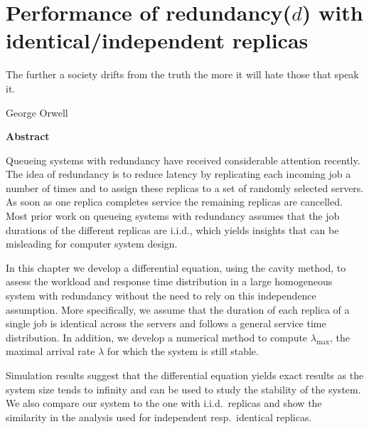 \documentclass[12pt]{report}
\newenvironment{chapabstract}{%
    \begin{center}%
      \bfseries Abstract
    \end{center}}%
   {\par}
\begin{document}
\chapter{Performance of redundancy($d$) with identical/independent replicas} \label{chap:Redd}
\epigraph{The further a society drifts from the truth the more it will hate those that speak it.}{George Orwell}
\begin{chapabstract}
Queueing systems with redundancy have received considerable attention recently. The idea of redundancy is to reduce latency by replicating each incoming job a number of times and to assign these replicas to a set of randomly selected servers. As soon as one replica completes service the remaining replicas are cancelled. Most prior work on queueing systems with redundancy assumes that the job durations of the different replicas are i.i.d., which yields insights that can be misleading for computer system design.

In this chapter we develop a differential equation, using the cavity method, to assess the workload and response time distribution in a large homogeneous system with redundancy without the need to rely on this independence assumption. More specifically, we assume that the duration of each replica of a single job is identical across the servers and follows a general service time distribution. In addition, we develop a numerical method to compute $\lambda_{\max}$, the maximal arrival rate $\lambda$ for which the system is still stable.

Simulation results suggest that the differential equation yields exact results as the system size tends to infinity and can be used to study the stability of the system. We also compare our system to the one with i.i.d.~replicas and show the similarity in the analysis used for independent resp.~identical replicas.
\end{chapabstract}
\end{document}
